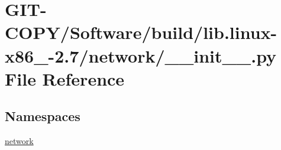 \hypertarget{GIT-COPY_2Software_2build_2lib_8linux-x86__64-2_87_2network_2____init_____8py}{}\section{G\+I\+T-\/\+C\+O\+P\+Y/\+Software/build/lib.linux-\/x86\+\_-\/2.7/network/\+\_\+\+\_\+init\+\_\+\+\_\+.py File Reference}
\label{GIT-COPY_2Software_2build_2lib_8linux-x86__64-2_87_2network_2____init_____8py}
\subsection*{Namespaces}
\begin{DoxyCompactItemize}
\item 
 \hyperlink{namespacenetwork}{network}
\end{DoxyCompactItemize}
